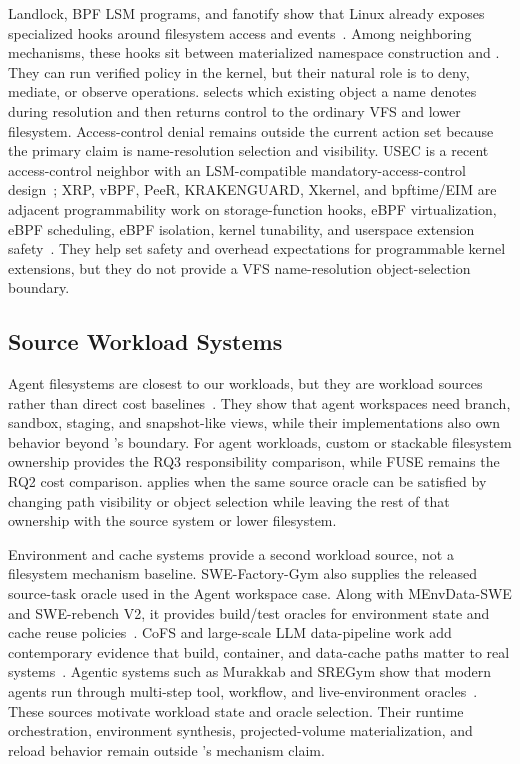 Landlock, BPF LSM programs, and fanotify show that Linux already exposes
specialized hooks around filesystem access and events~\cite{linux_landlock,linux_bpf_lsm,linux_fanotify}.
Among neighboring mechanisms, these hooks sit between materialized namespace
construction and \namei. They can run verified policy in the kernel, but their
natural role is to deny, mediate, or observe operations. \namei selects which
existing object a name denotes during resolution and then returns control to the
ordinary VFS and lower filesystem. Access-control denial remains outside the
current action set because the primary claim is name-resolution selection and
visibility. USEC is a recent access-control neighbor with an LSM-compatible
mandatory-access-control design~\cite{usec_osdi26}; XRP, vBPF, PeeR,
KRAKENGUARD, Xkernel, and bpftime/EIM are adjacent programmability work on
storage-function hooks, eBPF virtualization, eBPF scheduling, eBPF isolation,
kernel tunability, and userspace extension safety~\cite{xrp_osdi22,vbpf_osdi26,peer_osdi26,krakenguard_nsdi26,xkernel_osdi26,bpftime_eim_osdi25}.
They help set safety and overhead expectations for programmable kernel
extensions, but they do not provide a VFS name-resolution object-selection
boundary.

\subsection{Source Workload Systems}

Agent filesystems are closest to our workloads, but they are workload sources
rather than direct cost baselines~\cite{agentfs_repo,branchfs_repo,sandlock_repo,yolofs_repo}.
They show that agent workspaces need branch, sandbox, staging, and
snapshot-like views, while their implementations also own behavior beyond
\namei's boundary.
For agent workloads, custom or stackable filesystem ownership provides the RQ3
responsibility comparison, while FUSE remains the RQ2 cost comparison. \namei applies when the
same source oracle can be satisfied by changing path visibility or object
selection while leaving the rest of that ownership with the source system or
lower filesystem.

Environment and cache systems provide a second workload source, not a filesystem
mechanism baseline. SWE-Factory-Gym also supplies the released source-task
oracle used in the Agent workspace case. Along with MEnvData-SWE and SWE-rebench
V2, it provides build/test oracles for environment state and cache reuse
policies~\cite{swe_factory_repo,swe_factory_gym_dataset,menvagent_repo,swe_rebench_v2_repo}. CoFS and
large-scale LLM data-pipeline work add contemporary evidence that build,
container, and data-cache paths matter to real systems~\cite{cofs_fast26,llm_data_pipeline_osdi26}.
Agentic systems such as Murakkab and SREGym show that modern agents run through
multi-step tool, workflow, and live-environment oracles~\cite{murakkab_osdi26,sregym_arxiv26}.
These sources motivate workload state and oracle selection. Their runtime
orchestration, environment synthesis, projected-volume materialization, and
reload behavior remain outside \namei's mechanism claim.

